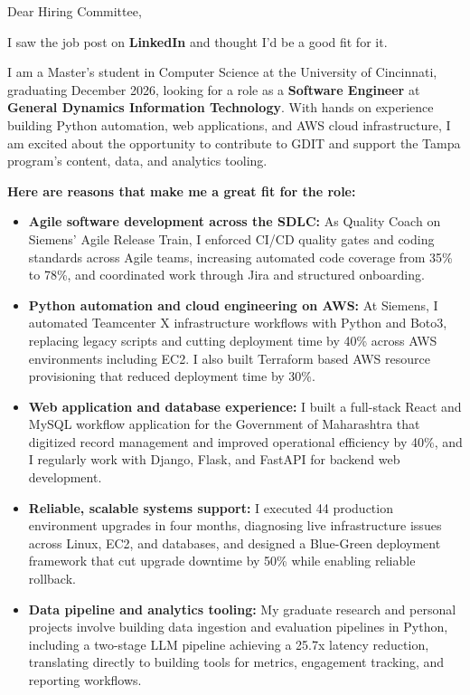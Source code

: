 \documentclass[11pt]{letter}
\date{}
\begin{document}
\begin{letter}{}

\opening{Dear Hiring Committee,}

I saw the job post on \textbf{LinkedIn} and thought I'd be a good fit for it.

I am a Master's student in Computer Science at the University of Cincinnati, graduating December 2026, looking for a role as a \textbf{Software Engineer} at \textbf{General Dynamics Information Technology}. With hands on experience building Python automation, web applications, and AWS cloud infrastructure, I am excited about the opportunity to contribute to GDIT and support the Tampa program's content, data, and analytics tooling.

\textbf{Here are reasons that make me a great fit for the role:}

\begin{itemize}[leftmargin=*, itemsep=0.45em]
    \item \textbf{Agile software development across the SDLC:} As Quality Coach on Siemens' Agile Release Train, I enforced CI/CD quality gates and coding standards across Agile teams, increasing automated code coverage from 35\% to 78\%, and coordinated work through Jira and structured onboarding.

    \item \textbf{Python automation and cloud engineering on AWS:} At Siemens, I automated Teamcenter X infrastructure workflows with Python and Boto3, replacing legacy scripts and cutting deployment time by 40\% across AWS environments including EC2. I also built Terraform based AWS resource provisioning that reduced deployment time by 30\%.

    \item \textbf{Web application and database experience:} I built a full-stack React and MySQL workflow application for the Government of Maharashtra that digitized record management and improved operational efficiency by 40\%, and I regularly work with Django, Flask, and FastAPI for backend web development.

    \item \textbf{Reliable, scalable systems support:} I executed 44 production environment upgrades in four months, diagnosing live infrastructure issues across Linux, EC2, and databases, and designed a Blue-Green deployment framework that cut upgrade downtime by 50\% while enabling reliable rollback.

    \item \textbf{Data pipeline and analytics tooling:} My graduate research and personal projects involve building data ingestion and evaluation pipelines in Python, including a two-stage LLM pipeline achieving a 25.7x latency reduction, translating directly to building tools for metrics, engagement tracking, and reporting workflows.
\end{itemize}


\end{letter}
\end{document}

